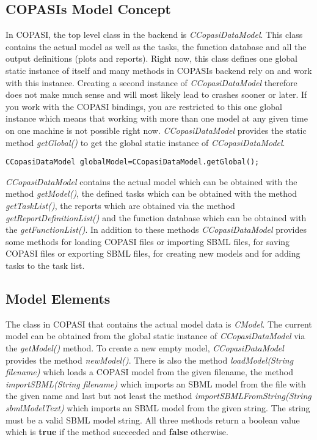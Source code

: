 \documentclass[a4,10pt]{article}
\begin{document}
\subsection{COPASIs Model Concept}
In COPASI, the top level class in the backend is \textit{CCopasiDataModel}. This class contains the actual model as well as the tasks, the function database and all the output definitions (plots and reports). Right now, this class defines one global static instance of itself and many methods in COPASIs backend rely on and work with this instance. Creating a second instance  of \textit{CCopasiDataModel} therefore does not make much sense and will most likely lead to crashes sooner or later. If you work with the COPASI bindings, you are restricted to this one global instance which means that working with more than one model at any given time on one machine is not possible right now.
\textit{CCopasiDataModel} provides the static method \textit{getGlobal()} to get the global static instance of \textit{CCopasiDataModel}.

\begin{lstlisting}
CCopasiDataModel globalModel=CCopasiDataModel.getGlobal();
\end{lstlisting}

\textit{CCopasiDataModel} contains the actual model which can be obtained with the method \textit{getModel()}, the defined tasks which can be obtained with the method \textit{getTaskList()}, the reports which are obtained via the method \textit{getReportDefinitionList()} and the function database which can be obtained with the \textit{getFunctionList()}.
In addition to these methods \textit{CCopasiDataModel} provides some methods for loading COPASI files or importing SBML files, for saving COPASI files or exporting SBML files, for creating new models and for adding tasks to the task list.

\subsection{Model Elements}
The class in COPASI that contains the actual model data is \textit{CModel}. The current model can be obtained from the global static instance of \textit{CCopasiDataModel} via the \textit{getModel()} method. To create a new empty model, \textit{CCopasiDataModel} provides the method \textit{newModel()}. There is also the method \textit{loadModel(String filename)} which loads a COPASI model from the given filename, the method \textit{importSBML(String filename)} which imports an SBML model from the file with the given name and last but not least the method \textit{importSBMLFromString(String sbmlModelText)} which imports an SBML model from the given string. The string must be a valid SBML model string. All three methods return a boolean value which is \textbf{true} if the method succeeded and \textbf{false} otherwise.
\end{document}

